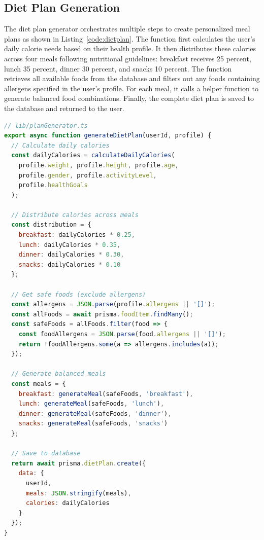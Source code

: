 \subsection{Diet Plan Generation}

The diet plan generator orchestrates multiple steps to create personalized meal plans as shown in Listing~\ref{code:dietplan}. The function first calculates the user's daily calorie needs based on their health profile. It then distributes these calories across four meals following nutritional guidelines: breakfast receives 25 percent, lunch 35 percent, dinner 30 percent, and snacks 10 percent. The function retrieves all available foods from the database and filters out any foods containing allergens specified in the user's profile. For each meal, it calls a helper function to generate balanced food combinations. Finally, the complete diet plan is saved to the database and returned to the user.

\begin{lstlisting}[language=JavaScript, caption=Diet Plan Generator, label=code:dietplan]
// lib/planGenerator.ts
export async function generateDietPlan(userId, profile) {
  // Calculate daily calories
  const dailyCalories = calculateDailyCalories(
    profile.weight, profile.height, profile.age,
    profile.gender, profile.activityLevel, 
    profile.healthGoals
  );
  
  // Distribute calories across meals
  const distribution = {
    breakfast: dailyCalories * 0.25,
    lunch: dailyCalories * 0.35,
    dinner: dailyCalories * 0.30,
    snacks: dailyCalories * 0.10
  };
  
  // Get safe foods (exclude allergens)
  const allergens = JSON.parse(profile.allergens || '[]');
  const allFoods = await prisma.foodItem.findMany();
  const safeFoods = allFoods.filter(food => {
    const foodAllergens = JSON.parse(food.allergens || '[]');
    return !foodAllergens.some(a => allergens.includes(a));
  });
  
  // Generate balanced meals
  const meals = {
    breakfast: generateMeal(safeFoods, 'breakfast'),
    lunch: generateMeal(safeFoods, 'lunch'),
    dinner: generateMeal(safeFoods, 'dinner'),
    snacks: generateMeal(safeFoods, 'snacks')
  };
  
  // Save to database
  return await prisma.dietPlan.create({
    data: { 
      userId, 
      meals: JSON.stringify(meals), 
      calories: dailyCalories 
    }
  });
}
\end{lstlisting}

